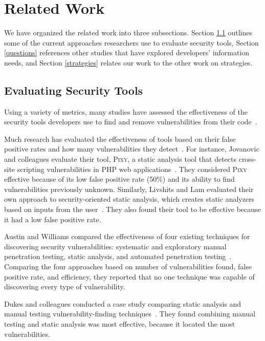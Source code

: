 \documentclass[10pt,journal,compsoc]{IEEEtran}
\begin{document}
\section{Related Work}
\label{sec:rw}

We have organized the related work into three subsections. 
Section \ref{evaluation} outlines some of the current approaches researchers use to evaluate security tools, Section \ref{questions} references other studies that have explored developers' information needs, and Section \ref{strategies} relates our work to the other work on strategies.

\subsection{Evaluating Security Tools}
\label{evaluation}
Using a variety of metrics, many studies have assessed the effectiveness of the security tools developers use to find and remove vulnerabilities from their code~\cite{martin2005finding, austin2011one, livshits2005finding}.  

Much research has evaluated the effectiveness of tools based on their false positive rates and how many vulnerabilities they detect~\cite{jovanovic2006pixy, austin2011one, dukes2013case}. 
For instance, Jovanovic and colleagues evaluate their tool, \textsc{Pixy}, a static analysis tool that detects cross-site scripting vulnerabilities in PHP web applications~\cite{jovanovic2006pixy}. 
They considered \textsc{Pixy} effective because of its low false positive rate (50\%) and its ability to find vulnerabilities previously unknown. 
Similarly, Livshits and Lam evaluated their own approach to security-oriented static analysis, which creates static analyzers based on inputs from the user~\cite{livshits2005finding}. 
They also found their tool to be effective because it had a low false positive rate. 

Austin and Williams compared the effectiveness of four existing techniques for discovering security vulnerabilities: systematic and exploratory manual  penetration testing, static analysis, and automated penetration testing~\cite{austin2011one}. 
Comparing the four approaches based on number of vulnerabilities found, false positive rate, and efficiency, they reported that no one technique was capable of discovering every type of vulnerability. 

Dukes and colleagues conducted a case study comparing static analysis and manual testing vulnerability-finding techniques~\cite{dukes2013case}. 
They found combining manual testing and static analysis was most effective, because it located the most vulnerabilities.
\end{document}
